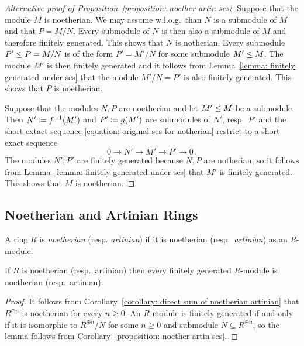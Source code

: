 \begin{proof}[Alternative proof of Proposition~\ref{proposition: noether artin ses}]
  Suppose that the module $M$ is noetherian.
  We may assume w.l.o.g.\ than $N$ is a submodule of $M$ and that $P = M/N$.
  Every submodule of $N$ is then also a submodule of $M$ and therefore finitely generated.
  This shows that $N$ is notherian.
  Every submodule $P' \leq P = M/N$ is of the form $P' = M'/N$ for some submodule $M' \leq M$.
  The module $M'$ is then finitely generated and it follows from Lemma~\ref{lemma: finitely generated under ses} that the module $M'/N = P'$ is also finitely generated.
  This shows that $P$ is noetherian.

  Suppose that the modules $N, P$ are noetherian and let $M' \leq M$ be a submodule.
  Then $N' \coloneqq f^{-1}(M')$ and $P' \coloneqq g(M')$ are submodules of $N'$, resp.\ $P'$ and the short extact sequence \eqref{equation: original ses for notherian} restrict to a short exact sequence
  \[
        0
    \to N'
    \to M'
    \to P'
    \to 0 \,.
  \]
  The modules $N', P'$ are finitely generated because $N, P$ are notherian, so it follows from Lemma~\ref{lemma: finitely generated under ses} that $M'$ is finitely generated.
  This shows that $M$ is noetherian.
\end{proof}





\subsection{Noetherian and Artinian Rings}


\begin{definition}
  A ring $R$ is \emph{noetherian} (resp. \emph{artinian}) if it is noetherian (resp.\ \emph{artinian}) as an $R$-module.
\end{definition}


\begin{lemma}
  \label{lemma: finitely generated over notherian artinian rings}
  If $R$ is noetherian (resp.\ artinian) then every finitely generated $R$-module is noetherian (resp.\ artinian).
\end{lemma}


\begin{proof}
  It follows from Corollary~\ref{corollary: direct sum of noetherian artinian} that $R^{\oplus n}$ is noetherian for every $n \geq 0$.
  An $R$-module is finitely-generated if and only if it is isomorphic to $R^{\oplus n}/N$ for some $n \geq 0$ and submodule $N \subseteq R^{\oplus n}$, so the lemma follows from Corollary~\ref{proposition: noether artin ses}.
\end{proof}



